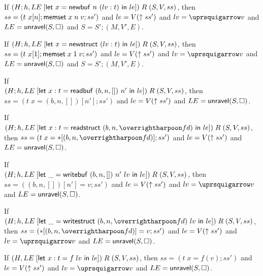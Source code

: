 \begin{lemma} \label{lemma-invert-newbuf}
  If $(H;h, LE\;[\text{\textsf{let}}\ x=\text{\textsf{newbuf}}\ n\ (lv:t)\ \text{\textsf{in}}\ le])\;R\;(S, V, ss)$, then $ss=(t\ x[n];\text{\textsf{memset}}\;x\;n\;v;ss')$ and $le=V(\uparrow ss')$ and $lv=\ctolowe{v}$ and $LE=\text{\textsf{unravel}}(S, \Box)$ and $S=S';(M, V', E)$.
\end{lemma}

\begin{lemma} \label{lemma-invert-newstruct}
  If $(H;h, LE\;[\text{\textsf{let}}\ x=\text{\textsf{newstruct}}\ (lv:t)\ \text{\textsf{in}}\ le])\;R\;(S, V, ss)$, then $ss=(t\ x[1];\text{\textsf{memset}}\;x\;1\;v;ss')$ and $le=V(\uparrow ss')$ and $lv=\ctolowe{v}$ and $LE=\text{\textsf{unravel}}(S, \Box)$ and $S=S';(M, V', E)$.
\end{lemma}

\begin{lemma} \label{lemma-invert-readbuf}
  If \\
  $(H;h, LE\;[\text{\textsf{let}}\ x:t=\text{\textsf{readbuf}}\ (b,n,[])\ n'\ \text{\textsf{in}}\ le])\;R\;(S, V, ss)$, then $ss=(t\;x=(b,n,[])[n'];ss')$ and $le=V(\uparrow ss')$ and $LE=\text{\textsf{unravel}}(S, \Box)$.
\end{lemma}

\begin{lemma} \label{lemma-invert-readstruct}
  If \\
  $(H;h, \fplug{LE}{\elet{x:t}{\ereadstruct{(b,n,\ls{fd})}}{le}})\;R\;(S, V, ss)$, then $ss=(t\;x=\eread{(b,n,\ls{fd})};ss')$ and $le=V(\uparrow ss')$ and $LE=\text{\textsf{unravel}}(S, \Box)$.
\end{lemma}

\begin{lemma} \label{lemma-invert-writebuf}
  If \\
  $(H;h, LE\;[\text{\textsf{let}}\ \_=\text{\textsf{writebuf}}\ (b,n,[])\ n'\ lv\ \text{\textsf{in}}\ le])\;R\;(S, V, ss)$, then $ss=((b,n,[])[n']=v;ss')$ and $le=V(\uparrow ss')$ and $lv=\ctolowe{v}$ and $LE=\text{\textsf{unravel}}(S, \Box)$.
\end{lemma}

\begin{lemma} \label{lemma-invert-writestruct}
  If \\
  $(H;h, \fplug{LE}{\elet{\_}{\ewritestruct{(b,n,\ls{fd})}{lv}}{le}})\;R\;(S, V, ss)$, then $ss=(\ewrite{(b,n,\ls{fd})}{v};ss')$ and $le=V(\uparrow ss')$ and $lv=\ctolowe{v}$ and $LE=\text{\textsf{unravel}}(S, \Box)$.
\end{lemma}

\begin{lemma} \label{lemma-invert-app}
  If $(H, LE\;[\text{\textsf{let}}\ x:t=f\;lv\ \text{\textsf{in}}\ le])\;R\;(S, V, ss)$, then $ss=(t\;x=f(v);ss')$ and $le=V(\uparrow ss')$ and $lv=\ctolowe{v}$ and $LE=\text{\textsf{unravel}}(S, \Box)$.
\end{lemma}

